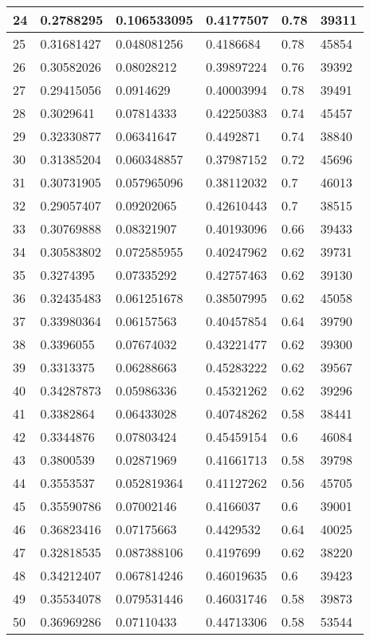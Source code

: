 \begin{longtable}{|l|l|l|l|l|l|}
24 & 0.2788295 & 0.106533095 & 0.4177507 & 0.78 & 39311 \\ \hline 
25 & 0.31681427 & 0.048081256 & 0.4186684 & 0.78 & 45854 \\ \hline 
26 & 0.30582026 & 0.08028212 & 0.39897224 & 0.76 & 39392 \\ \hline 
27 & 0.29415056 & 0.0914629 & 0.40003994 & 0.78 & 39491 \\ \hline 
28 & 0.3029641 & 0.07814333 & 0.42250383 & 0.74 & 45457 \\ \hline 
29 & 0.32330877 & 0.06341647 & 0.4492871 & 0.74 & 38840 \\ \hline 
30 & 0.31385204 & 0.060348857 & 0.37987152 & 0.72 & 45696 \\ \hline 
31 & 0.30731905 & 0.057965096 & 0.38112032 & 0.7 & 46013 \\ \hline 
32 & 0.29057407 & 0.09202065 & 0.42610443 & 0.7 & 38515 \\ \hline 
33 & 0.30769888 & 0.08321907 & 0.40193096 & 0.66 & 39433 \\ \hline 
34 & 0.30583802 & 0.072585955 & 0.40247962 & 0.62 & 39731 \\ \hline 
35 & 0.3274395 & 0.07335292 & 0.42757463 & 0.62 & 39130 \\ \hline 
36 & 0.32435483 & 0.061251678 & 0.38507995 & 0.62 & 45058 \\ \hline 
37 & 0.33980364 & 0.06157563 & 0.40457854 & 0.64 & 39790 \\ \hline 
38 & 0.3396055 & 0.07674032 & 0.43221477 & 0.62 & 39300 \\ \hline 
39 & 0.3313375 & 0.06288663 & 0.45283222 & 0.62 & 39567 \\ \hline 
40 & 0.34287873 & 0.05986336 & 0.45321262 & 0.62 & 39296 \\ \hline 
41 & 0.3382864 & 0.06433028 & 0.40748262 & 0.58 & 38441 \\ \hline 
42 & 0.3344876 & 0.07803424 & 0.45459154 & 0.6 & 46084 \\ \hline 
43 & 0.3800539 & 0.02871969 & 0.41661713 & 0.58 & 39798 \\ \hline 
44 & 0.3553537 & 0.052819364 & 0.41127262 & 0.56 & 45705 \\ \hline 
45 & 0.35590786 & 0.07002146 & 0.4166037 & 0.6 & 39001 \\ \hline 
46 & 0.36823416 & 0.07175663 & 0.4429532 & 0.64 & 40025 \\ \hline 
47 & 0.32818535 & 0.087388106 & 0.4197699 & 0.62 & 38220 \\ \hline 
48 & 0.34212407 & 0.067814246 & 0.46019635 & 0.6 & 39423 \\ \hline 
49 & 0.35534078 & 0.079531446 & 0.46031746 & 0.58 & 39873 \\ \hline 
50 & 0.36969286 & 0.07110433 & 0.44713306 & 0.58 & 53544 \\ \hline 
\end{longtable}
